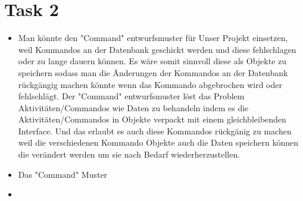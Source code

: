 \chapter{Task 2}
\begin{itemize}
   \item Man könnte den "Command" entwurfsmuster für Unser Projekt einsetzen, weil Kommandos an der Datenbank geschickt werden und diese fehlschlagen oder zu lange dauern können. Es wäre somit sinnvoll diese als Objekte zu speichern sodass man die Änderungen der Kommandos an der Datenbank rückgängig machen könnte wenn das Kommando abgebrochen wird oder fehlschlägt. Der "Command" entwurfsmuster löst das Problem Aktivitäten/Commandos wie Daten zu behandeln indem es die Aktivitäten/Commandos in Objekte verpackt mit einem gleichbleibenden Interface. Und das erlaubt es auch diese Kommandos rückgänig zu machen weil die verschiedenen Kommando Objekte auch die Daten speichern können die verändert werden um sie nach Bedarf wiederherzustellen.
   \item Das "Command" Muster
   \item 
\end{itemize}
